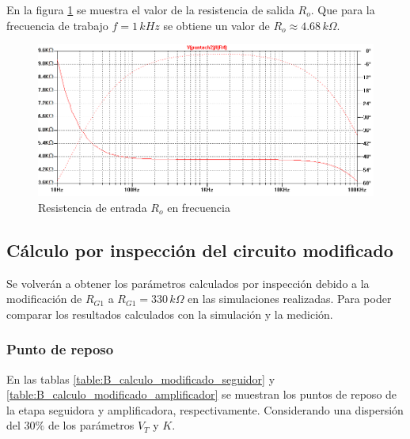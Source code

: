 \documentclass[10pt,spanish,a4paper,notitlepage]{article}
\begin{document}
En la figura \ref{fig:B_Ro} se muestra el valor
de la resistencia de salida $R_o$.
Que para la frecuencia de trabajo $f=1\,\unit{kHz}$ se obtiene
un valor de $R_o \approx 4.68\,\unit{k\Omega}$.

\begin{figure}[H]
\centering
\includegraphics[scale=0.5]{simulaciones/B_sim_Ro.png}
\caption{Resistencia de entrada $R_o$ en frecuencia}
\label{fig:B_Ro}
\end{figure}

\subsection{Cálculo por inspección del circuito modificado}

Se volverán a obtener los parámetros calculados por inspección debido a la 
modificación de $R_{G1}$ a $R_{G1} = 330\,\unit{k\Omega}$ en las simulaciones realizadas. Para poder
comparar los resultados calculados con la simulación y la medición.

\subsubsection{Punto de reposo}

En las tablas \ref{table:B_calculo_modificado_seguidor} y \ref{table:B_calculo_modificado_amplificador}
se muestran los puntos de reposo de la etapa seguidora y amplificadora, respectivamente. Considerando
una dispersión del $30\%$ de los parámetros $V_T$ y $K$.
\end{document}
